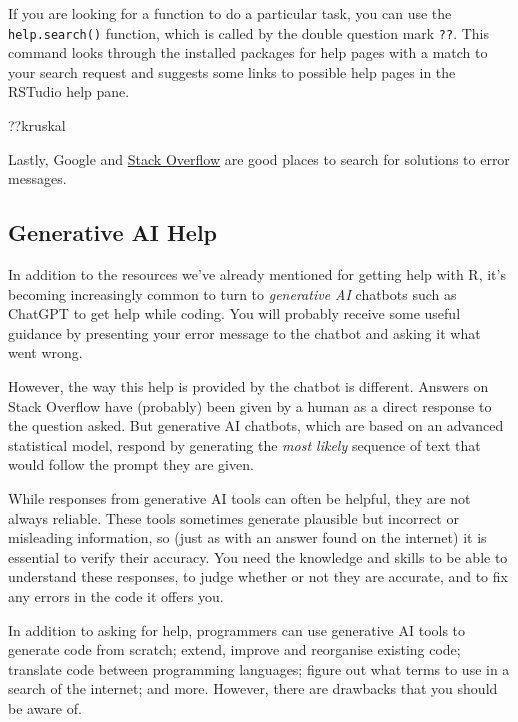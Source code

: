 \documentclass[
]{book}
\newenvironment{Shaded}{\begin{snugshade}}{\end{snugshade}}
\newcommand{\NormalTok}[1]{#1}
\begin{document}
If you are looking for a function to do a particular task, you can use the
\texttt{help.search()} function, which is called by the double question mark \texttt{??}.
This command looks through the installed packages for help pages with a
match to your search request and suggests some links to possible help pages in the
RSTudio help pane.

\begin{Shaded}
\begin{Highlighting}[]
\NormalTok{??kruskal}
\end{Highlighting}
\end{Shaded}

Lastly, Google and \href{http://stackoverflow.com/questions/tagged/r}{Stack Overflow} are good places to search for solutions to error messages.

\subsection{Generative AI Help}\label{generative-ai-help}

In addition to the resources we've already mentioned for getting help with R, it's becoming increasingly common to turn to \emph{generative AI} chatbots such as ChatGPT to get help while coding. You will probably receive some useful guidance by presenting your error message to the chatbot and asking it what went wrong.

However, the way this help is provided by the chatbot is different. Answers on Stack Overflow have (probably) been given by a human as a direct response to the question asked. But generative AI chatbots, which are based on an advanced statistical model, respond by generating the \emph{most likely} sequence of text that would follow the prompt they are given.

While responses from generative AI tools can often be helpful, they are not always reliable.
These tools sometimes generate plausible but incorrect or misleading information, so (just as with an answer found on the internet) it is essential to verify their accuracy.
You need the knowledge and skills to be able to understand these responses, to judge whether or not they are accurate, and to fix any errors in the code it offers you.

In addition to asking for help, programmers can use generative AI tools to generate code from scratch; extend, improve and reorganise existing code; translate code between programming languages; figure out what terms to use in a search of the internet; and more.
However, there are drawbacks that you should be aware of.
\end{document}
